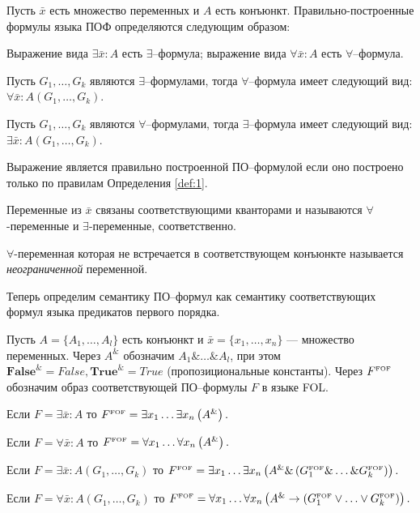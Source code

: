 \begin{definition}\label{def:1}
Пусть $\bar{x}$ есть множество переменных и $A$ есть конъюнкт. Правильно-построенные формулы языка ПОФ определяются следующим образом:

Выражение вида $\exists \bar{x}\colon A$ есть $\exists$--формула; выражение вида $\forall \bar{x}\colon A$ есть $\forall$--формула.

Пусть $G_1,\ldots,G_k$ являются $\exists$--формулами, тогда $\forall$--формула имеет следующий вид: $\forall \bar{x}\colon A\left(G_1,\ldots,G_k\right)$.

Пусть $G_1,\ldots,G_k$ являются $\forall$--формулами, тогда $\exists$--формула имеет следующий вид: $\exists \bar{x}\colon A\left(G_1,\ldots,G_k\right)$.

\end{definition}

Выражение является правильно построенной ПО--формулой если оно построено только по правилам Определения \ref{def:1}.

Переменные из $\bar{x}$ связаны соответствующими кванторами и называются $\forall$-переменные и $\exists$-переменные, соответственно.

$\forall$-переменная которая не встречается в соответствующем конъюнкте называется {\em неограниченной} переменной.

Теперь определим семантику ПО--формул как семантику соответствующих формул языка предикатов первого порядка.

\begin{definition}\label{def:semantic}
Пусть $A = \{A_1,\ldots,A_l\}$ есть конъюнкт и $\bar{x} = \{x_1,\ldots,x_n\}$ --- множество переменных. Через $A^{\&}$ обозначим $A_1 \&\ldots\&A_l$, при этом $\boldsymbol{False}^{\&}= False, \boldsymbol{True}^{\&}=True$ (пропозициональные константы). Через $F^{\text{\tiny{FOF}}}$ обозначим образ соответствующей ПО--формулы $F$ в языке FOL.

Если $F= \exists \bar{x}\colon A$ то $F^{\text{\tiny{FOF}}} = \exists x_1 \ldots \exists x_n \left(A^{\&}\right).$

Если $F = \forall \bar{x}\colon A$ то $F^{\text{\tiny{FOF}}} = \forall x_1 \ldots \forall x_n \left(A^{\&}\right).$

Если $F = \exists \bar{x}\colon A\left(G_1,\ldots,G_k\right)$ то $F^{\text{\tiny{FOF}}} = \exists x_1 \ldots \exists x_n  \left(A^{\&} \& \left(G_{1}^{\text{\tiny{FOF}}} \& \ldots \& G_{k}^{\text{\tiny{FOF}}}\right)\right).$

Если $F = \forall \bar{x}\colon A\left(G_1,\ldots,G_k\right)$ то $F^{\text{\tiny{FOF}}} = \forall x_1 \ldots \forall x_n \left(A^{\&}\rightarrow \left(G_{1}^{\text{\tiny{FOF}}} \vee\ldots\vee G_{k}^{\text{\tiny{FOF}}}\right)\right).$

\end{definition}

